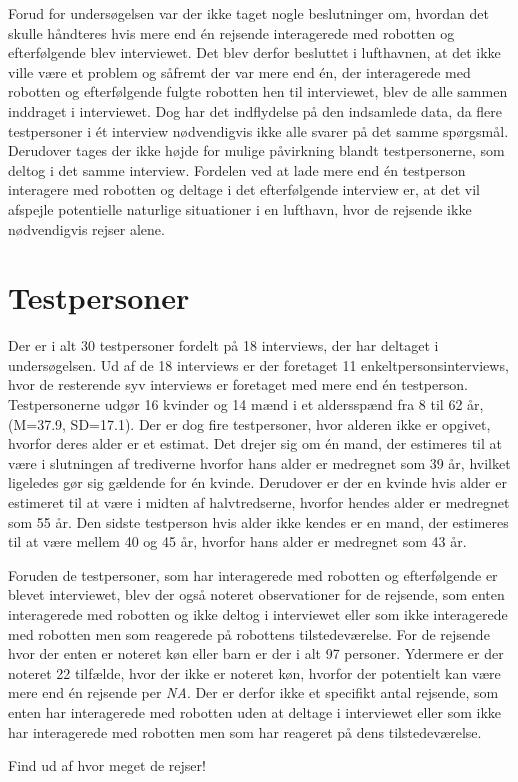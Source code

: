 Forud for undersøgelsen var der ikke taget nogle beslutninger om, hvordan det skulle håndteres hvis mere end én rejsende interagerede med robotten og efterfølgende blev interviewet. Det blev derfor besluttet i lufthavnen, at det ikke ville være et problem og såfremt der var mere end én, der interagerede med robotten og efterfølgende fulgte robotten hen til interviewet, blev de alle sammen inddraget i interviewet. Dog har det indflydelse på den indsamlede data, da flere testpersoner i ét interview nødvendigvis ikke alle svarer på det samme spørgsmål. Derudover tages der ikke højde for mulige påvirkning blandt testpersonerne, som deltog i det samme interview. Fordelen ved at lade mere end én testperson interagere med robotten og deltage i det efterfølgende interview er, at det vil afspejle potentielle naturlige situationer i en lufthavn, hvor de rejsende ikke nødvendigvis rejser alene.        

\section{Testpersoner}
\label{ParametreTestpersoner}
%
Der er i alt 30 testpersoner fordelt på 18 interviews, der har deltaget i undersøgelsen. Ud af de 18 interviews er der foretaget 11 enkeltpersonsinterviews, hvor de resterende syv interviews er foretaget med mere end én testperson. Testpersonerne udgør 16 kvinder og 14 mænd i et aldersspænd fra 8 til 62 år, (M=37.9, SD=17.1). Der er dog fire testpersoner, hvor alderen ikke er opgivet, hvorfor deres alder er et estimat. Det drejer sig om én mand, der estimeres til at være i slutningen af trediverne hvorfor hans alder er medregnet som 39 år, hvilket ligeledes gør sig gældende for én kvinde. Derudover er der en kvinde hvis alder er estimeret til at være i midten af halvtredserne, hvorfor hendes alder er medregnet som 55 år. Den sidste testperson hvis alder ikke kendes er en mand, der estimeres til at være mellem 40 og 45 år, hvorfor hans alder er medregnet som 43 år. 

Foruden de testpersoner, som har interagerede med robotten og efterfølgende er blevet interviewet, blev der også noteret observationer for de rejsende, som enten interagerede med robotten og ikke deltog i interviewet eller som ikke interagerede med robotten men som reagerede på robottens tilstedeværelse. For de rejsende hvor der enten er noteret køn eller barn er der i alt 97 personer. Ydermere er der noteret 22 tilfælde, hvor der ikke er noteret køn, hvorfor der potentielt kan være mere end én rejsende per \textit{NA}. Der er derfor ikke et specifikt antal rejsende, som enten har interagerede med robotten uden at deltage i interviewet eller som ikke har interagerede med robotten men som har reageret på dens tilstedeværelse. \blankline 


Find ud af hvor meget de rejser! 
